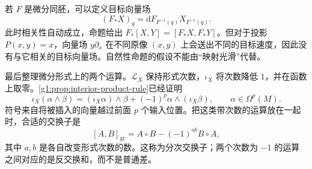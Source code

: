 若 \(F\) 是微分同胚，可以定义目标向量场
\[
	(F_*X)_q=\mathrm{d}F_{F^{-1}(q)}X_{F^{-1}(q)}.
\]
此时相关性自动成立，命题给出 \(F_*[X,Y]=[F_*X,F_*Y]\)。但对于投影 \(P(x,y)=x\)，向量场 \(y\partial_x\) 在不同原像 \((x,y)\) 上会送出不同的目标速度，因此没有与它相关的目标向量场。自然性命题的假设不能由“映射光滑”代替。

\ProseParagraphBreak

最后整理微分形式上的两个运算。\(\mathcal L_X\) 保持形式次数，\(\iota_X\) 将次数降低 \(1\)，并在函数上取零。\cref{g1:prop:interior-product-rule}已经证明
\[
	\iota_X(\alpha\wedge\beta)
	=(\iota_X\alpha)\wedge\beta+(-1)^p\alpha\wedge(\iota_X\beta),
	\qquad \alpha\in\Omega^p(M).
\]
符号来自将被插入的向量越过前面 \(p\) 个输入位置。把这类带次数的运算放在一起时，合适的交换子是
\[
	[A,B]_{\mathrm{gr}}=A\circ B-(-1)^{ab}B\circ A,
\]
其中 \(a,b\) 是各自改变形式次数的数。这称为分次交换子；两个次数为 \(-1\) 的运算之间对应的是反交换和，而不是普通差。

